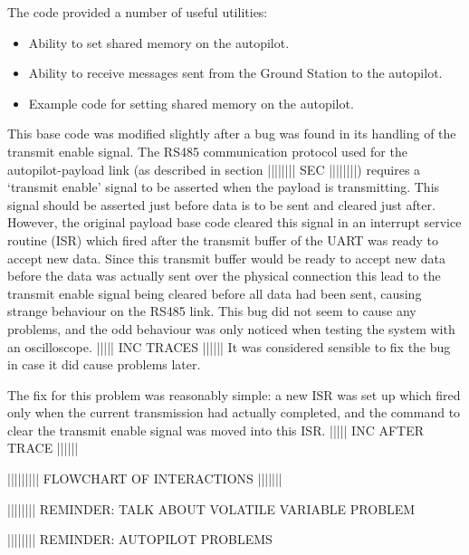 The code provided a number of useful utilities:
\begin{itemize}
\item Ability to set shared memory on the autopilot.

\item Ability to receive messages sent from the Ground Station to the 
autopilot.

\item Example code for setting shared memory on the autopilot.
\end{itemize}

This base code was modified slightly after a bug was found in its handling of 
the transmit enable signal. The RS485 communication protocol used for the 
autopilot-payload link (as described in section |||||||| SEC ||||||||) 
requires a `transmit enable' signal to be asserted when the payload is 
transmitting. This signal should be asserted just before data is to be sent 
and cleared just after. However, the original payload base code cleared this 
signal in an interrupt service routine (ISR) which fired after the transmit 
buffer of the UART was ready to accept new data. Since this transmit buffer 
would be ready to accept new data before the data was actually sent over the
physical connection this lead to the transmit enable signal being cleared
before all data had been sent, causing strange behaviour on the RS485 link.
This bug did not seem to cause any problems, and the odd behaviour was only
noticed when testing the system with an oscilloscope. ||||| INC TRACES ||||||
It was considered sensible to fix the bug in case it did cause problems later.

The fix for this problem was reasonably simple: a new ISR was set up which 
fired only when the current transmission had actually completed, and the 
command to clear the transmit enable signal was moved into this ISR.
||||| INC AFTER TRACE ||||||


||||||||| FLOWCHART OF INTERACTIONS |||||||


|||||||| REMINDER: TALK ABOUT VOLATILE VARIABLE PROBLEM

|||||||| REMINDER: AUTOPILOT PROBLEMS

